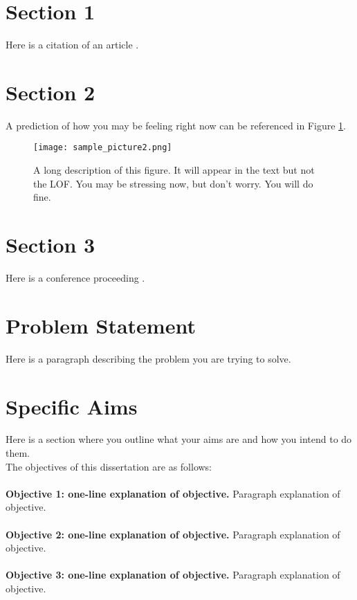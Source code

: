 
\section{Section 1}
Here is a citation of an article \cite{article1}.

\section{Section 2}
A prediction of how you may be feeling right now can be referenced in Figure \ref{fig:picture_sad}.

\begin{figure}[!ht]
	{\texttt{[image: sample\_picture2.png]}} 
    \centering
  	\caption[A short description of this figure for the LOF]{A long description of this figure. It will appear in the text but not the LOF. You may be stressing now, but don't worry. You will do fine.} 
 	\label{fig:picture_sad}
\end{figure} 

\section{Section 3}
Here is a conference proceeding \cite{conference1}.

\section{Problem Statement}

Here is a paragraph describing the problem you are trying to solve. 

\section{Specific Aims}
Here is a section where you outline what your aims are and how you intend to do them. \\

\noindent
The objectives of this dissertation are as follows:
\\ \\
\textbf{Objective 1: one-line explanation of objective.} 
Paragraph explanation of objective.
\\ \\
\textbf{Objective 2: one-line explanation of objective.} 
Paragraph explanation of objective. \\ \\
\noindent
\noindent
\textbf{Objective 3: one-line explanation of objective.} 
Paragraph explanation of objective. 

